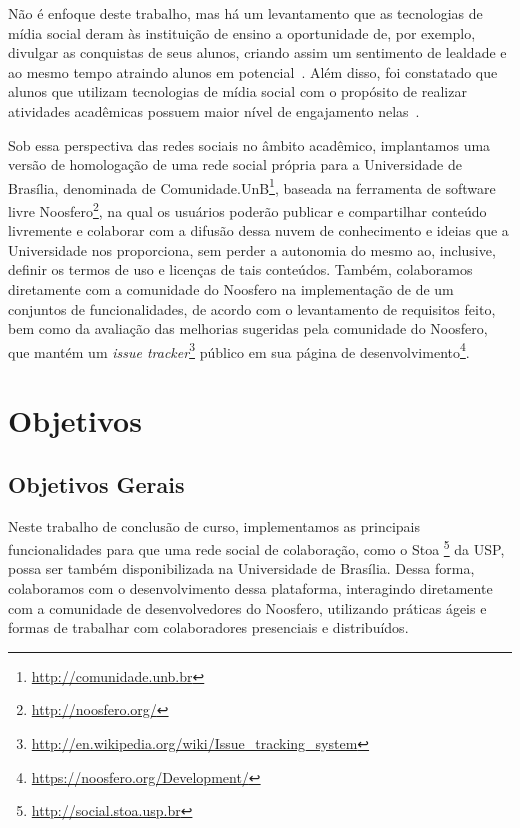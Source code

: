  
 
Não é enfoque deste trabalho, mas há um levantamento que as tecnologias de mídia social deram às
instituição de ensino a oportunidade de, por exemplo, divulgar as conquistas de seus alunos,
criando assim um sentimento de lealdade e ao mesmo tempo atraindo alunos em
potencial~\cite{solis2008}. 
%
Além disso, foi constatado que alunos que utilizam tecnologias de mídia social
com o propósito de realizar atividades acadêmicas possuem maior nível de
engajamento nelas~. 
 
 
Sob essa perspectiva das redes sociais no âmbito acadêmico, implantamos uma versão de homologação
de uma rede social própria para a Universidade de
Brasília, denominada de Comunidade.UnB\footnote{\url{http://comunidade.unb.br}}, baseada na ferramenta de software livre 
Noosfero\footnote{\url{http://noosfero.org/}},
na qual os usuários poderão publicar e compartilhar conteúdo livremente e
colaborar com a difusão dessa nuvem de conhecimento e ideias que a Universidade
nos proporciona, sem perder a autonomia do mesmo ao, inclusive, definir os termos
de uso e licenças de tais conteúdos.
%
Também, colaboramos diretamente com a comunidade do Noosfero na implementação de
de um conjuntos de funcionalidades, de acordo com o levantamento de requisitos feito,
bem como da avaliação das melhorias sugeridas pela comunidade do Noosfero, que mantém
um \textit{issue tracker}\footnote{\url{http://en.wikipedia.org/wiki/Issue_tracking_system}}
público em sua página de desenvolvimento\footnote{\url{https://noosfero.org/Development/}}.
 
 
\section{Objetivos}
 
\subsection{Objetivos Gerais}
 
Neste trabalho de conclusão de curso, implementamos as
principais funcionalidades para que uma rede social de colaboração, como o Stoa%
\footnote{\url{http://social.stoa.usp.br}} da USP, 
possa ser também disponibilizada na Universidade de Brasília. 
%
Dessa forma, colaboramos com o desenvolvimento dessa plataforma, interagindo diretamente com
a  comunidade de desenvolvedores do Noosfero, utilizando práticas ágeis e formas de trabalhar
com colaboradores presenciais e distribuídos.
 
